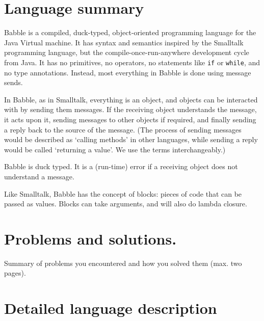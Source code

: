 \documentclass[a4paper]{article}
\begin{document}
\begin{titlepage}
\maketitle
\end{titlepage}

\tableofcontents

\section{Language summary}
Babble is a compiled, duck-typed, object-oriented programming language for the Java Virtual machine.
It has syntax and semantics inspired by the Smalltalk programming language, but the compile-once-run-anywhere development cycle from Java.
It has no primitives, no operators, no statements like \texttt{if} or \texttt{while}, and no type annotations.
Instead, most everything in Babble is done using message sends.

In Babble, as in Smalltalk, everything is an object, and objects can be interacted with by sending them messages.
If the receiving object understands the message, it acts upon it, sending messages to other objects if required, and finally sending a reply back to the source of the message.
(The process of sending messages would be described as `calling methods' in other languages, while sending a reply would be called `returning a value'.
We use the terms interchangeably.)

Babble is duck typed.
It is a (run-time) error if a receiving object does not understand a message.

Like Smalltalk, Babble has the concept of blocks: pieces of code that can be passed as values.
Blocks can take arguments, and will also do lambda closure.

\section{Problems and solutions.}
Summary of problems you encountered and how you solved them (max. two
pages).

\section{Detailed language description}
\end{document}
